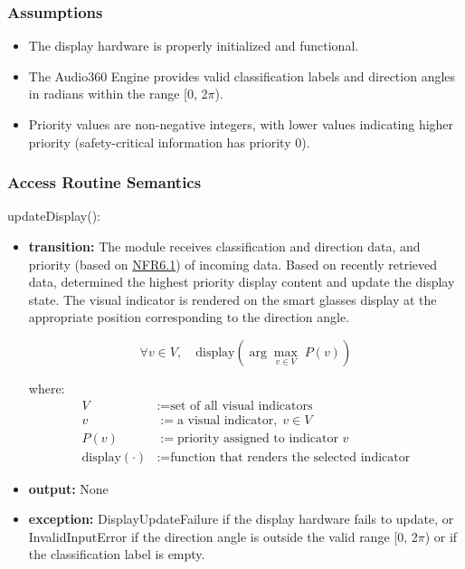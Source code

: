 \documentclass[12pt, titlepage]{article}
\begin{document}
\subsubsection{Assumptions}

\begin{itemize}
  \item The display hardware is properly initialized and functional.
  \item The Audio360 Engine provides valid classification labels and direction
    angles in radians within the range [0, 2$\pi$).
  \item Priority values are non-negative integers, with lower values indicating
    higher priority (safety-critical information has priority 0).
\end{itemize}

\subsubsection{Access Routine Semantics}

\noindent updateDisplay():
\begin{itemize}
\item \textbf{transition:} The module receives classification and direction
  data, and priority (based on \hyperref[SRS-NFR6_1]{NFR6.1}) of incoming data.
  Based on recently retrieved data, determined the highest priority display
  content and update the display state. The visual indicator is rendered on the
  smart glasses display at the appropriate position corresponding to the
  direction angle. 

    \[
    \forall v \in V,\quad \text{display}\left(\arg\max_{v \in V} \; P(v)\right)
    \]

    \noindent where:
    \begin{align*}
    V &:= \text{set of all visual indicators} \\
    v &:= \text{a visual indicator},\; v \in V \\
    P(v) &:= \text{priority assigned to indicator } v \\
    \text{display}(\cdot) &:= \text{function that renders the selected indicator}
    \end{align*}

\item \textbf{output:} None

\item \textbf{exception:} DisplayUpdateFailure if the display hardware fails to
  update, or InvalidInputError if the direction angle is outside the valid range
  [0, 2$\pi$) or if the classification label is empty.
\end{itemize}
\end{document}
